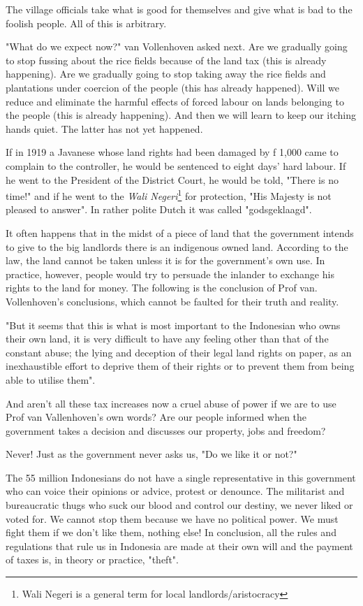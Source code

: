 The village officials take what is good for themselves and give what is bad to the foolish people. All of this is arbitrary.\nline

"What do we expect now?" van Vollenhoven asked next. Are we gradually going to stop 
fussing about the rice fields because of the land tax (this is already happening). 
Are we gradually going to stop taking away the rice fields and plantations under 
coercion of the people (this has already happened). Will we reduce and eliminate 
the harmful effects of forced labour on lands belonging to the people (this is already happening). 
And then we will learn to keep our itching hands quiet. The latter has not yet happened.\nline

If in 1919 a Javanese whose land rights had been damaged by f 1,000 came to complain to 
the controller, he would be sentenced to eight days' hard labour. If he went to the President of 
the District Court, he would be told, "There is no time!" and if he went to the \emph{Wali Negeri}\footnote[6]{Wali Negeri is a general term for local landlords/aristocracy} 
for protection, "His Majesty is not pleased to answer". In rather polite Dutch it was called "godsgeklaagd".

It often happens that in the midst of a piece of land that the government intends 
to give to the big landlords there is an indigenous owned land. According to the law, 
the land cannot be taken unless it is for the government's own use. In practice, 
however, people would try to persuade the inlander to exchange his rights to the land for money.
The following is the conclusion of Prof van. Vollenhoven's conclusions, which cannot be faulted for their truth and reality.\nline

"But it seems that this is what is most important to the Indonesian who owns their own land, 
it is very difficult to have any feeling other than that of the constant abuse; the lying and 
deception of their legal land rights on paper, as an inexhaustible effort to deprive them of 
their rights or to prevent them from being able to utilise them".\nline

And aren't all these tax increases now a cruel abuse of power if 
we are to use Prof van Vallenhoven's own words? Are our people 
informed when the government takes a decision and discusses our property, jobs and freedom?\nline

Never! Just as the government never asks us, "Do we like it or not?"\nline

The 55 million Indonesians do not have a single representative in this government 
who can voice their opinions or advice, protest or denounce. The militarist and 
bureaucratic thugs who suck our blood and control our destiny, we never liked or 
voted for. We cannot stop them because we have no political power. We must fight 
them if we don't like them, nothing else! In conclusion, all the rules and regulations 
that rule us in Indonesia are made at their own will and the payment of taxes is, in theory or practice, "theft".\nline

